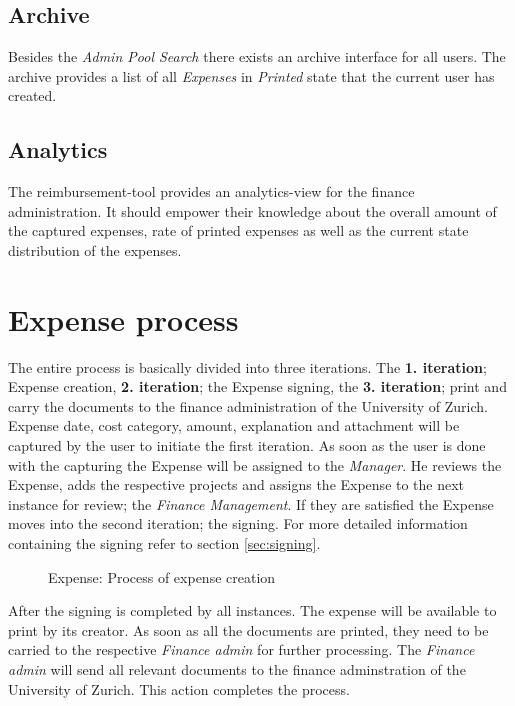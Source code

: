 \subsection{Archive}
Besides the \textit{Admin Pool Search} there exists an archive interface for all users. The archive provides a list of all \textit{Expenses} in \textit{Printed} state that the current user has created.

\subsection{Analytics}
The reimbursement-tool provides an analytics-view for the finance administration. It should empower their knowledge about the overall amount of the captured expenses, rate of printed expenses as well as the current state distribution of the expenses.  


\section{Expense process}
\label{sec:process}

The entire process is basically divided into three iterations. The \textbf{1. iteration}; Expense creation, \textbf{2. iteration}; the Expense signing, the \textbf{3. iteration}; print and carry the documents to the finance administration of the University of Zurich.\newline 
Expense date, cost category, amount, explanation and attachment will be captured by the user to initiate the first iteration. As soon as the user is done with the capturing the Expense will be assigned to the \textit{Manager}. He reviews the Expense, adds the respective projects and assigns the Expense to the next instance for review; the \textit{Finance Management}. If they are satisfied the Expense moves into the second iteration; the signing. For more detailed information containing the signing refer to section \ref{sec:signing}.\newline

\begin{figure}[H]
    \centering
    \caption{Expense: Process of expense creation}
    \label{fig:expense-process}
\end{figure}

After the signing is completed by all instances. The expense will be available to print by its creator. As soon as all the documents are printed, they need to be carried to the respective \textit{Finance admin} for further processing. The \textit{Finance admin} will send all relevant documents to the finance adminstration of the University of Zurich. This action completes the process.   


